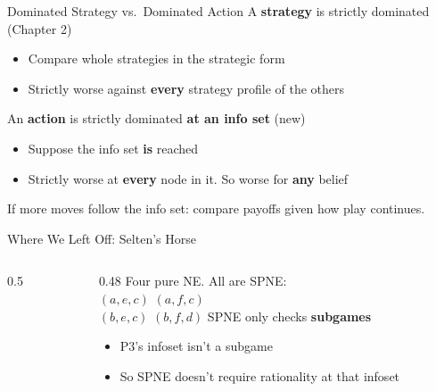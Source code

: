 \begin{frame}{Dominated Strategy vs.\ Dominated Action}
A \textbf{strategy} is strictly dominated \hfill {\footnotesize (Chapter 2)}
\begin{itemize}
    \item Compare whole strategies in the strategic form
    \item Strictly worse against \textbf{every} strategy profile of the others
\end{itemize}
\bsk
An \textbf{action} is strictly dominated \textbf{at an info set} \hfill {\footnotesize (new)}
\begin{itemize}
    \item Suppose the info set \textbf{is} reached
    \item Strictly worse at \textbf{every} node in it. So worse for \textbf{any} belief
\end{itemize}
\bsk
{}
\bsk
{}
\vfill
{\footnotesize If more moves follow the info set: compare payoffs given how play continues.}
\vspace{-0.2in}
\end{frame}

\begin{frame}{Where We Left Off: Selten's Horse}
\begin{columns}[c]
\begin{column}{0.5\textwidth}
\centering
\horse
\end{column}
\begin{column}{0.48\textwidth}
Four pure NE. All are SPNE:\\[4pt]
$(a,e,c)$ \quad $(a,f,c)$\\[2pt]
$(b,e,c)$ \quad $(b,f,d)$
\bsk
SPNE only checks \textbf{subgames}
\begin{itemize}
    \item P3's infoset isn't a subgame
    \item So SPNE doesn't require rationality at that infoset
\end{itemize}
\bsk
{}
\bsk
{}
\end{column}
\end{columns}
\vspace{-0.3in}
\end{frame}

